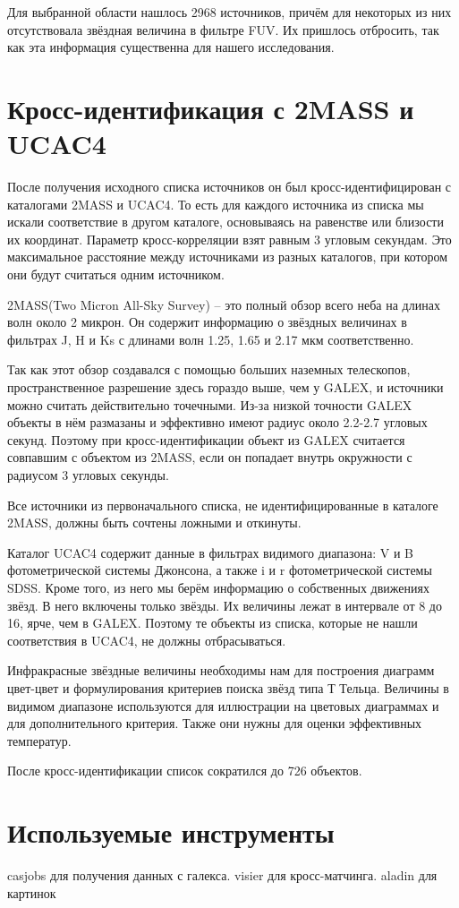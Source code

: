 
Для выбранной области нашлось 2968 источников, причём для некоторых из них отсутствовала звёздная величина в фильтре FUV. Их пришлось отбросить, так как эта информация существенна для нашего исследования.


\section{Кросс-идентификация с 2MASS и UCAC4}
После получения исходного списка источников он был кросс-идентифицирован с каталогами 2MASS и UCAC4. То есть для каждого источника из списка мы искали соответствие в другом каталоге, основываясь на равенстве или близости их координат. Параметр кросс-корреляции взят равным 3 угловым секундам. Это максимальное расстояние между источниками из разных каталогов, при котором они будут считаться одним источником.

2MASS(Two Micron All-Sky Survey) -- это полный обзор всего неба на длинах волн около 2 микрон. Он содержит информацию о звёздных величинах в фильтрах J, H и Ks с длинами волн 1.25, 1.65 и 2.17 мкм соответственно.

Так как  этот обзор создавался с помощью больших наземных телескопов, пространственное разрешение здесь гораздо выше, чем у GALEX, и источники можно считать действительно точечными. Из-за низкой точности GALEX объекты в нём размазаны и эффективно имеют радиус около 2.2-2.7 угловых секунд. Поэтому при кросс-идентификации объект из GALEX считается совпавшим с объектом из 2MASS, если он попадает внутрь окружности с радиусом 3 угловых секунды.

Все источники из первоначального списка, не идентифицированные в каталоге 2MASS, должны быть сочтены ложными и откинуты.

Каталог UCAC4 содержит данные в фильтрах видимого диапазона: V и B фотометрической системы Джонсона, а также i и r фотометрической системы SDSS. Кроме того, из него мы берём информацию о собственных движениях звёзд. В него включены только звёзды. Их величины лежат в интервале от 8 до 16, ярче, чем в GALEX. Поэтому те объекты из списка, которые не нашли соответствия в UCAC4, не должны отбрасываться.

Инфракрасные звёздные величины необходимы нам для построения диаграмм цвет-цвет и формулирования критериев поиска звёзд типа Т Тельца. Величины в видимом диапазоне используются для иллюстрации на цветовых диаграммах и для дополнительного критерия. Также они нужны для оценки эффективных температур.

После кросс-идентификации список сократился до 726 объектов. 

\section{Используемые инструменты}
casjobs для получения данных с галекса. visier для кросс-матчинга. aladin для картинок

